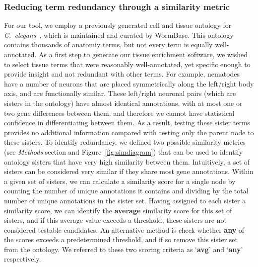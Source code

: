 \subsubsection*{Reducing term redundancy through a similarity metric}
For our tool, we employ a previously generated cell and tissue ontology for
\emph{C.~elegans}~\cite{Lee2003}, which is maintained and curated by WormBase.
This ontology contains thousands of anatomiy terms, but not every term is
equally well-annotated. As a first step to generate our tissue enrichment
software, we wished to select tissue terms that were reasonably well-annotated,
yet specific enough to provide insight and not redundant with other terms. For
example, nematodes have a number of neurons that are placed symmetrically along
the left/right body axis, and are functionally similar. These left/right neuronal
pairs (which are sisters in the ontology) have almost identical annotations,
with at most one or two gene differences between them, and therefore we cannot
have statistical confidence in differentiating between them. As a result, testing
these sister terms provides no additional information compared with testing only
the parent node to these sisters. To identify redundancy, we defined two possible
similarity metrics (see \emph{Methods} section and Figure~\ref{fig:simdiagram})
that can be used to identify ontology sisters that have very high similarity
between them. Intuitively, a set of sisters can be considered very similar if
they share most gene annotations. Within a given set of sisters, we can
calculate a similarity score for a single node by counting the number of
unique annotations it contains and dividing by the total number of unique
annotations in the sister set. Having assigned to each sister a similarity score,
we can identify the \textbf{average} similarity score for this set of sisters,
and if this average value exceeds a threshold, these sisters are not considered
testable candidates. An alternative method is check whether \textbf{any} of the
scores exceeds a predetermined threshold, and if so remove this sister set from
the ontology. We referred to these two scoring criteria as `\textbf{avg}' and
`\textbf{any}' respectively.

